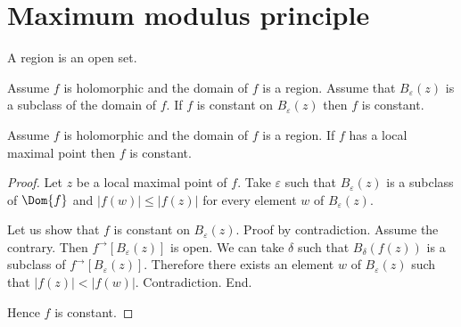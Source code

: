 \documentclass{article}
\newcommand{\Ball}[2]{B_{#1}(#2)}
\newcommand{\image}[2]{#1^{\to}[#2]}
\begin{document}
    \section{Maximum modulus principle}

  \begin{forthel}
    \begin{signature}
      A region is an open set.
    \end{signature}

    \begin{axiom}
      Assume $f$ is holomorphic and the domain of $f$ is a region.
      Assume that $\Ball{\varepsilon}{z}$ is a subclass of the domain of $f$.
      If $f$ is constant on $\Ball{\varepsilon}{z}$ then $f$ is constant.
    \end{axiom}

    \begin{proposition}
      Assume $f$ is holomorphic and the domain of $f$ is a region.
      If $f$ has a local maximal point then $f$ is constant.
    \end{proposition}
    \begin{proof}
      Let $z$ be a local maximal point of $f$.
      Take $\varepsilon$ such that
        $\Ball{\varepsilon}{z}$ is a subclass of $\Dom{f}$
        and $|f(w)| \leq |f(z)|$ for every element $w$ of $\Ball{\varepsilon}{z}$.

      Let us show that $f$ is constant on $\Ball{\varepsilon}{z}$.
      Proof by contradiction.
        Assume the contrary.
        Then $\image{f}{\Ball{\varepsilon}{z}}$ is open.
        We can take $\delta$ such that
          $\Ball{\delta}{f(z)}$ is a subclass of $\image{f}{\Ball{\varepsilon}{z}}$.
        Therefore there exists an element $w$ of $\Ball{\varepsilon}{z}$ such that
          $|f(z)| < |f(w)|$. Contradiction.
    	End.

      Hence $f$ is constant.
    \end{proof}
  \end{forthel}
\end{document}

